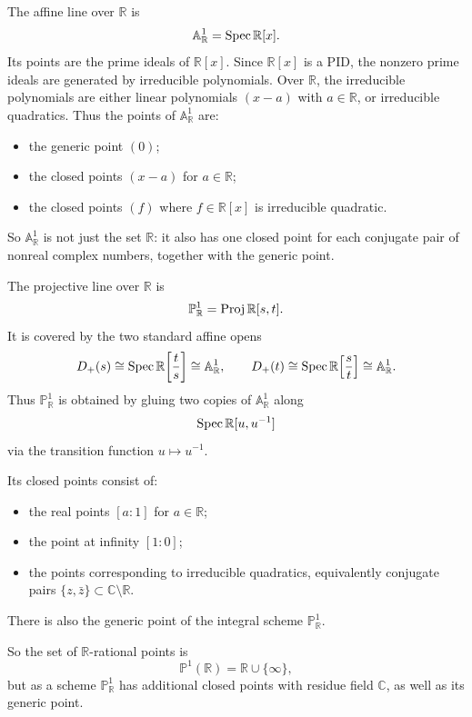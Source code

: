 \documentclass[12pt]{article}
\begin{document}
\begin{example}
    The affine line over \(\mathbb R\) is
    \[
        \mathbb A^1_{\mathbb R}=\operatorname{Spec} \mathbb R[x].
    \]
    Its points are the prime ideals of \(\mathbb R[x]\). Since \(\mathbb R[x]\) is a PID, the nonzero prime ideals are generated by irreducible polynomials. Over \(\mathbb R\), the irreducible polynomials are either linear polynomials \((x-a)\) with \(a\in \mathbb R\), or irreducible quadratics. Thus the points of \(\mathbb A^1_{\mathbb R}\) are:
    \begin{itemize}
        \item the generic point \((0)\);
        \item the closed points \((x-a)\) for \(a\in \mathbb R\);
        \item the closed points \((f)\) where \(f\in \mathbb R[x]\) is irreducible quadratic.
    \end{itemize}
    So \(\mathbb A^1_{\mathbb R}\) is not just the set \(\mathbb R\): it also has one closed point for each conjugate pair of nonreal complex numbers, together with the generic point.

    The projective line over \(\mathbb R\) is
    \[
        \mathbb P^1_{\mathbb R}=\operatorname{Proj} \mathbb R[s,t].
    \]
    It is covered by the two standard affine opens
    \[
        D_+(s)\cong \operatorname{Spec} \mathbb R\!\left[\frac{t}{s}\right]\cong \mathbb A^1_{\mathbb R},
        \qquad
        D_+(t)\cong \operatorname{Spec} \mathbb R\!\left[\frac{s}{t}\right]\cong \mathbb A^1_{\mathbb R}.
    \]
    Thus \(\mathbb P^1_{\mathbb R}\) is obtained by gluing two copies of \(\mathbb A^1_{\mathbb R}\) along
    \[
        \operatorname{Spec} \mathbb R[u,u^{-1}]
    \]
    via the transition function \(u\mapsto u^{-1}\).

    Its closed points consist of:
    \begin{itemize}
        \item the real points \([a:1]\) for \(a\in \mathbb R\);
        \item the point at infinity \([1:0]\);
        \item the points corresponding to irreducible quadratics, equivalently conjugate pairs \(\{z,\bar z\}\subset \mathbb C\setminus \mathbb R\).
    \end{itemize}
    There is also the generic point of the integral scheme \(\mathbb P^1_{\mathbb R}\).

    So the set of \(\mathbb R\)-rational points is
    \[
        \mathbb P^1(\mathbb R)=\mathbb R\cup\{\infty\},
    \]
    but as a scheme \(\mathbb P^1_{\mathbb R}\) has additional closed points with residue field \(\mathbb C\), as well as its generic point.
\end{example}
\end{document}
